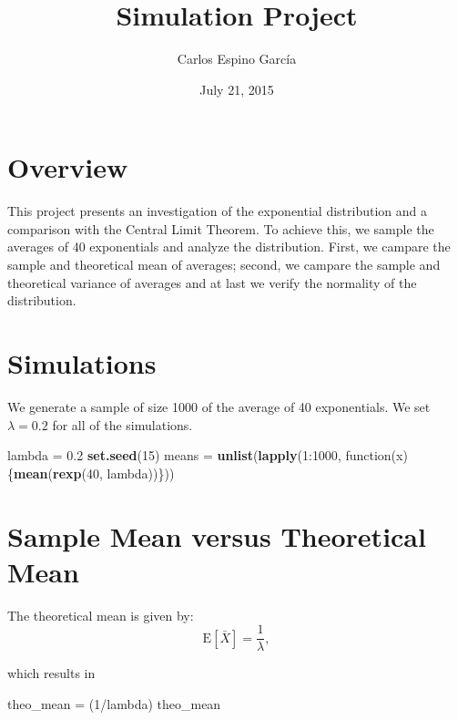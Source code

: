 \documentclass[]{article}
\title{Simulation Project}
\author{Carlos Espino García}
\date{July 21, 2015}
\newenvironment{Shaded}{\begin{snugshade}}{\end{snugshade}}
\newcommand{\KeywordTok}[1]{\textcolor[rgb]{0.13,0.29,0.53}{\textbf{{#1}}}}
\newcommand{\DecValTok}[1]{\textcolor[rgb]{0.00,0.00,0.81}{{#1}}}
\newcommand{\FloatTok}[1]{\textcolor[rgb]{0.00,0.00,0.81}{{#1}}}
\newcommand{\StringTok}[1]{\textcolor[rgb]{0.31,0.60,0.02}{{#1}}}
\newcommand{\NormalTok}[1]{{#1}}
\begin{document}
\maketitle


\section{Overview}

This project presents an investigation of the exponential distribution
and a comparison with the Central Limit Theorem. To achieve this, we
sample the averages of 40 exponentials and analyze the distribution.
First, we campare the sample and theoretical mean of averages; second,
we campare the sample and theoretical variance of averages and at last
we verify the normality of the distribution.

\section{Simulations}

We generate a sample of size 1000 of the average of 40 exponentials. We
set \(\lambda = 0.2\) for all of the simulations.

\begin{Shaded}
\begin{Highlighting}[]
\NormalTok{lambda =}\StringTok{ }\FloatTok{0.2}
\KeywordTok{set.seed}\NormalTok{(}\DecValTok{15}\NormalTok{)}
\NormalTok{means =}\StringTok{ }\KeywordTok{unlist}\NormalTok{(}\KeywordTok{lapply}\NormalTok{(}\DecValTok{1}\NormalTok{:}\DecValTok{1000}\NormalTok{, function(x)\{}\KeywordTok{mean}\NormalTok{(}\KeywordTok{rexp}\NormalTok{(}\DecValTok{40}\NormalTok{, lambda))\}))}
\end{Highlighting}
\end{Shaded}

\section{Sample Mean versus Theoretical Mean}

The theoretical mean is given by: \[
\mbox{E}\left[\bar{X}\right] = \frac{1}{\lambda},
\]

which results in

\begin{Shaded}
\begin{Highlighting}[]
\NormalTok{theo_mean =}\StringTok{ }\NormalTok{(}\DecValTok{1}\NormalTok{/lambda)}
\NormalTok{theo_mean}
\end{Highlighting}
\end{Shaded}
\end{document}
